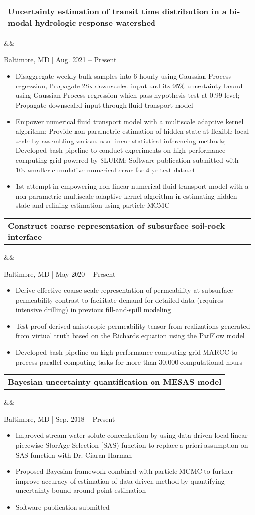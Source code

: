 \documentclass[12pt,letterpaper,sans]{moderncv}        %
\makeatletter
\newcommand*{\customcvproject}[4][.25em]{
  \begin{tabular}{@{}l} 
    {\bfseries #2} { #3}
  \end{tabular}


      

  \ifx&#4&%
  \else{\\%
    \begin{minipage}{\maincolumnwidth}%
      \small#4%
    \end{minipage}}\fi%
  \par\addvspace{#1}}
\makeatother
\begin{document}
{%
{\customcvproject{Uncertainty estimation of transit time distribution in a bi-modal hydrologic response watershed}{}{}}
Baltimore, MD | Aug. 2021 – Present 
\begin{itemize}
\item Disaggregate weekly bulk samples into 6-hourly using Gaussian Process regression; Propagate 28x downscaled input and its 95\% uncertainty bound using Gaussian Process regression which pass hypothesis test at 0.99 level; Propagate downscaled input through fluid transport model
\item Empower numerical fluid transport model with a multiscale adaptive kernel algorithm; Provide non-parametric estimation of hidden state at flexible local scale by assembling various non-linear statistical inferencing methods; Developed bash pipeline to conduct experiments on high-performance computing grid powered by SLURM; Software publication submitted with 10x smaller cumulative numerical error for 4-yr test dataset \cite{harman2022mesas}
\item 1st attempt in empowering non-linear numerical fluid transport model with a non-parametric multiscale adaptive kernel algorithm in estimating hidden state and refining estimation using particle MCMC
\end{itemize}
 
{\customcvproject{Construct coarse representation of subsurface soil-rock interface}{}
{}}
Baltimore, MD | May 2020 – Present
\begin{itemize}
  \item Derive effective coarse-scale representation of permeability at subsurface permeability contrast to facilitate demand for detailed data (requires intensive drilling) in previous fill-and-spill modeling
    \item Test proof-derived anisotropic permeability tensor from realizations generated from virtual truth based on the Richards equation using the ParFlow model
    \item Developed bash pipeline on high performance computing grid MARCC to process parallel computing tasks for more than 30,000 computational hours
 \end{itemize}

{\customcvproject{Bayesian uncertainty quantification on MESAS model}{}
{}}
Baltimore, MD | Sep. 2018 – Present
\begin{itemize}
\item Improved stream water solute concentration by using data-driven local linear piecewise StorAge Selection (SAS) function to replace a-priori assumption on SAS function with Dr. Ciaran Harman
\item Proposed Bayesian framework combined with particle MCMC to further improve accuracy of estimation of data-driven method by quantifying uncertainty bound around point estimation
\item Software publication submitted
\end{itemize}

}
\end{document}
